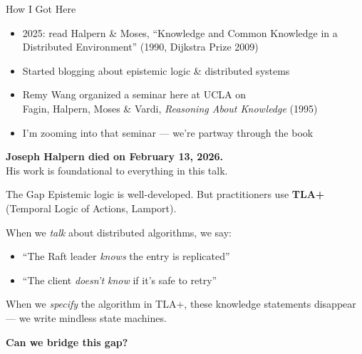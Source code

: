 \documentclass[aspectratio=169,12pt]{beamer}
\begin{document}

\begin{frame}{How I Got Here}
\begin{itemize}
\item 2025: read Halpern \& Moses, ``Knowledge and Common Knowledge in a Distributed Environment'' (1990, Dijkstra Prize 2009)
\item Started blogging about epistemic logic \& distributed systems
\item Remy Wang organized a seminar here at UCLA on\\Fagin, Halpern, Moses \& Vardi, \emph{Reasoning About Knowledge} (1995)
\item I'm zooming into that seminar --- we're partway through the book
\end{itemize}

\vspace{1em}
\textbf{Joseph Halpern died on February 13, 2026.}\\
His work is foundational to everything in this talk.
\end{frame}


\begin{frame}{The Gap}
Epistemic logic is well-developed. But practitioners use \textbf{TLA+}
(Temporal Logic of Actions, Lamport).

\vspace{0.5em}
When we \emph{talk} about distributed algorithms, we say:
\begin{itemize}
\item ``The Raft leader \emph{knows} the entry is replicated''
\item ``The client \emph{doesn't know} if it's safe to retry''
\end{itemize}

\vspace{0.5em}
When we \emph{specify} the algorithm in TLA+, these knowledge statements disappear ---
we write mindless state machines.

\vspace{1em}
\textbf{Can we bridge this gap?}
\end{frame}

\end{document}
